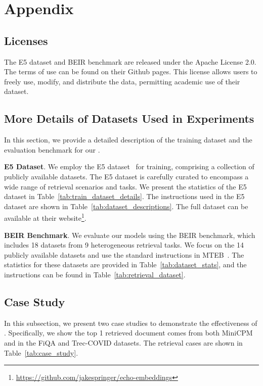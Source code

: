 \section{Appendix}
\subsection{Licenses}
The E5 dataset and BEIR benchmark are released under the Apache License 2.0.
The terms of use can be found on their Github pages.
This license allows users to freely use, modify, and distribute the data, permitting academic use of their dataset.

\subsection{More Details of Datasets Used in Experiments}
In this section, we provide a detailed description of the training dataset and the evaluation benchmark for our \method{}.

\textbf{E5 Dataset}.
We employ the E5 dataset~\cite{wang2023improving, springer2024repetition} for training, comprising a collection of publicly available datasets. The E5 dataset is carefully curated to encompass a wide range of retrieval scenarios and tasks. We present the statistics of the E5 dataset in Table~\ref{tab:train_dataset_details}. The instructions used in the E5 dataset are shown in Table~\ref{tab:dataset_descriptions}. The full dataset can be available at their website\footnote{\url{https://github.com/jakespringer/echo-embeddings}}.

\textbf{BEIR Benchmark}.
We evaluate our \method{} models using the BEIR benchmark, which includes 18 datasets from 9 heterogeneous retrieval tasks. We focus on the 14 publicly available datasets and use the standard instructions in MTEB~\cite{muennighoff2022mteb}. The statistics for these datasets are provided in Table~\ref{tab:dataset_stats}, and the instructions can be found in Table~\ref{tab:retrieval_dataset}.






\label{app:dataset}


\subsection{Case Study}
\label{app:case_study}

%
In this subsection, we present two case studies to demonstrate the effectiveness of \method{}. Specifically, we show the top 1 retrieved document comes from both MiniCPM and \method{} in the FiQA and Trec-COVID datasets. The retrieval cases are shown in Table~\ref{tab:case_study}.

